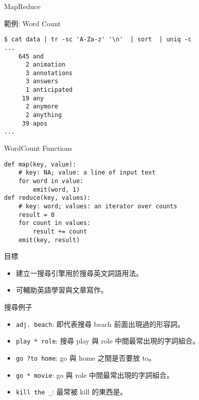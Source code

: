 \documentclass[12pt,c]{beamer}
\begin{document}
\begin{frame}{MapReduce}
\end{frame}


\begin{frame}[containsverbatim]{範例: Word Count}
\begin{verbatim}
$ cat data | tr -sc 'A-Za-z' '\n'  | sort  | uniq -c
...
    645 and
      2 animation
      3 annotations
      3 answers
      1 anticipated
     19 any
      2 anymore
      2 anything
     39 apos
...
\end{verbatim}
\end{frame}



\begin{frame}[containsverbatim]{WordCount Functions}
\begin{verbatim}
def map(key, value):
    # key: NA; value: a line of input text
    for word in value:
        emit(word, 1)
def reduce(key, values):
    # key: word; values: an iterator over counts
    result = 0
    for count in values:
        result += count
    emit(key, result)
\end{verbatim}
\end{frame}



\begin{frame}{目標}
  \begin{itemize}
  \item 建立一搜尋引擎用於搜尋英文詞語用法。
  \item 可輔助英語學習與文章寫作。
  \end{itemize}

  \begin{block}{搜尋例子}
    \begin{itemize}
    \item \lstinline|adj. beach|: 即代表搜尋 beach 前面出現過的形容詞。
    \item \lstinline|play * role|: 搜尋 play 與 role 中間最常出現的字詞組合。
    \item \lstinline|go ?to home|: go 與 home 之間是否要放 to。
    \item \lstinline|go * movie|: go 與 role 中間最常出現的字詞組合。 
    \item \lstinline|kill the _|: 最常被 kill 的東西是。
    \end{itemize}
  \end{block}
\end{frame}
\end{document}
